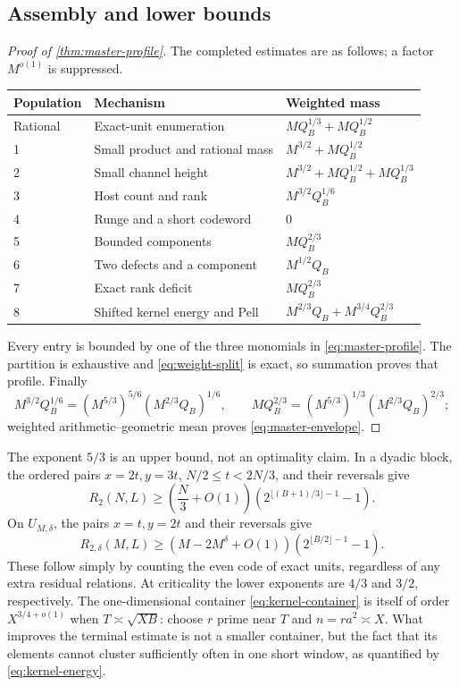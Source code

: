 \subsection{Assembly and lower bounds}
\begin{proof}[Proof of \cref{thm:master-profile}]
The completed estimates are as follows; a factor $M^{o(1)}$ is suppressed.
\begin{center}\small
\begin{tabularx}{\textwidth}{@{}lXl@{}}\toprule
Population & Mechanism & Weighted mass\\\midrule
Rational & Exact-unit enumeration & $MQ_B^{1/3}+MQ_B^{1/2}$\\
1 & Small product and rational mass & $M^{3/2}+MQ_B^{1/2}$\\
2 & Small channel height & $M^{3/2}+MQ_B^{1/2}+MQ_B^{1/3}$\\
3 & Host count and rank & $M^{3/2}Q_B^{1/6}$\\
4 & Runge and a short codeword & $0$\\
5 & Bounded components & $MQ_B^{2/3}$\\
6 & Two defects and a component & $M^{1/2}Q_B$\\
7 & Exact rank deficit & $MQ_B^{2/3}$\\
8 & Shifted kernel energy and Pell & $M^{2/3}Q_B+M^{3/4}Q_B^{2/3}$\\\bottomrule
\end{tabularx}
\end{center}
Every entry is bounded by one of the three monomials in
\eqref{eq:master-profile}. The partition is exhaustive and
\eqref{eq:weight-split} is exact, so summation proves that profile.
Finally
\[
 M^{3/2}Q_B^{1/6}=(M^{5/3})^{5/6}(M^{2/3}Q_B)^{1/6},\qquad
 MQ_B^{2/3}=(M^{5/3})^{1/3}(M^{2/3}Q_B)^{2/3};
\]
weighted arithmetic--geometric mean proves \eqref{eq:master-envelope}.
\end{proof}

The exponent $5/3$ is an upper bound, not an optimality claim. In a dyadic
block, the ordered pairs $x=2t,y=3t$, $N/2\le t<2N/3$, and their reversals
give
\begin{equation}\label{eq:rational-lower-dyadic}
 R_2(N,L)\ge\left(\frac N3+O(1)\right)
       \left(2^{\lfloor(B+1)/3\rfloor-1}-1\right).
\end{equation}
On $U_{M,\delta}$, the pairs $x=t,y=2t$ and their reversals give
\begin{equation}\label{eq:rational-lower-macro}
 R_{2,\delta}(M,L)\ge(M-2M^\delta+O(1))
       \left(2^{\lfloor B/2\rfloor-1}-1\right).
\end{equation}
These follow simply by counting the even code of exact units, regardless
of any extra residual relations. At criticality the lower exponents are
$4/3$ and $3/2$, respectively. The one-dimensional container
\eqref{eq:kernel-container} is itself of order $X^{3/4+o(1)}$ when
$T\asymp\sqrt{XB}$: choose $r$ prime near $T$ and $n=ra^2\asymp X$.
What improves the terminal estimate is not a smaller container, but the
fact that its elements cannot cluster sufficiently often in one short
window, as quantified by \eqref{eq:kernel-energy}.


